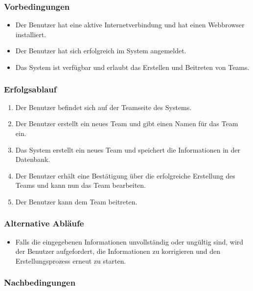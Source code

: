 \subsubsection*{Vorbedingungen}

\begin{itemize}
  \item Der Benutzer hat eine aktive Internetverbindung und hat einen Webbrowser installiert.
  \item Der Benutzer hat sich erfolgreich im System angemeldet.
  \item Das System ist verfügbar und erlaubt das Erstellen und Beitreten von Teams.
\end{itemize}

\subsubsection*{Erfolgsablauf}

\begin{enumerate}
  \item Der Benutzer befindet sich auf der Teamseite des Systems.
  \item Der Benutzer erstellt ein neues Team und gibt einen Namen für das Team ein.
  \item Das System erstellt ein neues Team und speichert die Informationen in der Datenbank.
  \item Der Benutzer erhält eine Bestätigung über die erfolgreiche Erstellung des Teams und kann nun das Team bearbeiten.
  \item Der Benutzer kann dem Team beitreten.
\end{enumerate}

\subsubsection*{Alternative Abläufe}

\begin{itemize}
  \item Falls die eingegebenen Informationen unvollständig oder ungültig sind, wird der Benutzer aufgefordert, die Informationen zu korrigieren
   und den Erstellungsprozess erneut zu starten.
\end{itemize}

\subsubsection*{Nachbedingungen}

